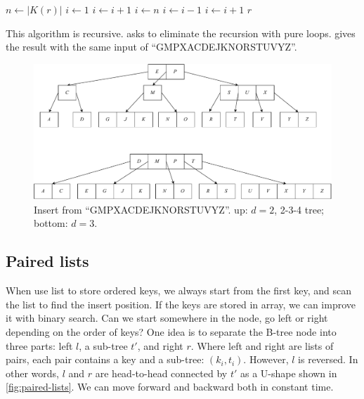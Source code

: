 \documentclass[b5paper]{article}
\begin{document}
\begin{algorithmic}[1]
  \State $n \gets |K(r)|$
    \State $i \gets 1$
      \State $i \gets i + 1$
    \EndWhile
    \State {}
  \Else
    \State $i \gets n$
      \State $i \gets i - 1$
    \EndWhile
      \State {}
        \State $i \gets i + 1$
      \EndIf
    \EndIf
    \State {}
  \EndIf
  \State \Return $r$
\EndFunction
\end{algorithmic}

This algorithm is recursive.  asks to eliminate the recursion with pure loops.  gives the result with the same input of ``GMPXACDEJKNORSTUVYZ''.

\begin{figure}[htbp]
  \centering
  \includegraphics[scale=0.5]{img/btree-split-insert-example}
  \caption{Insert from ``GMPXACDEJKNORSTUVYZ''. up: $d = 2$, 2-3-4 tree; bottom: $d = 3$.}
  \label{fig:btree-insert}
\end{figure}

\subsection{Paired lists}

When use list to store ordered keys, we always start from the first key, and scan the list to find the insert position. If the keys are stored in array, we can improve it with binary search. Can we start somewhere in the node, go left or right depending on the order of keys? One idea is to separate the B-tree node into three parts: left $l$, a sub-tree $t'$, and right $r$. Where left and right are lists of pairs, each pair contains a key and a sub-tree: $(k_i, t_i)$. However, $l$ is reversed. In other words, $l$ and $r$ are head-to-head connected by $t'$ as a U-shape shown in \cref{fig:paired-lists}. We can move forward and backward both in constant time.
\end{document}
